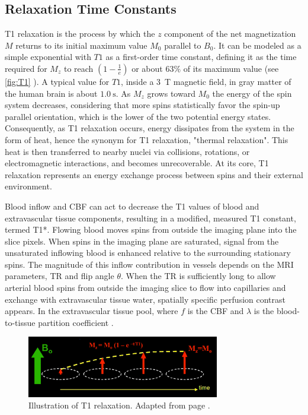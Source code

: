 \subsection{Relaxation Time Constants}

T1 relaxation is the process by which the $z$ component of the net magnetization $M$ returns to its initial maximum value $M_0$ parallel to $B_0$. It can be modeled as a simple exponential with $T1$ as a first-order time constant, defining it as the time required for $M_z$ to reach $(1 - \frac{1}{e})$ or about $63\%$ of its maximum value (see \autoref{fig:T1} \cite{T1}). A typical value for $T1$, inside a \SI{3}{\tesla} magnetic field, in gray matter of the human brain is about $\SI{1.0}{\second}$. As $M_z$ grows toward $M_0$ the energy of the spin system decreases, considering that more spins statistically favor the spin-up parallel orientation, which is the lower of the two potential energy states. Consequently, as T1 relaxation occurs, energy dissipates from the system in the form of heat, hence the synonym for T1 relaxation, "thermal relaxation". This heat is then transferred to nearby nuclei via collisions, rotations, or electromagnetic interactions, and becomes unrecoverable. At its core, T1 relaxation represents an energy exchange process between spins and their external environment.

Blood inflow and \gls{CBF} can act to decrease the T1 values of blood and extravascular tissue components, resulting in a modified, measured T1 constant, termed T1*. Flowing blood moves spins from outside the imaging plane into the slice pixels. When spins in the imaging plane are saturated, signal from the unsaturated inflowing blood is enhanced relative to the surrounding stationary spins. The magnitude of this inflow contribution in vessels depends on the \gls{MRI} parameters, \gls{TR} and \gls{flip angle} $\theta$. When the \gls{TR} is sufficiently long to allow arterial blood spins from outside the imaging slice to flow into capillaries and exchange with extravascular tissue water, spatially specific perfusion contrast appears. In the extravascular tissue pool,  where $f$ is the \gls{CBF} and $\lambda$ is the blood-to-tissue partition coefficient \cite{Detre1992}. 

\begin{figure}[htbp]
    \centering
    \includegraphics[width = 0.75\textwidth]{assets/images/T1_illustration.jpg}
    \caption[T1 Relaxation]{Illustration of T1 relaxation. Adapted from page \cite{T1}.}
    \label{fig:T1}
\end{figure}

